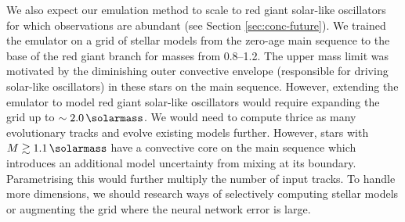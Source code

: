 


We also expect our emulation method to scale to red giant solar-like oscillators for which observations are abundant (see Section \ref{sec:conc-future}). We trained the emulator on a grid of stellar models from the zero-age main sequence to the base of the red giant branch for masses from \SIrange{0.8}{1.2}{\solarmass}. The upper mass limit was motivated by the diminishing outer convective envelope (responsible for driving solar-like oscillators) in these stars on the main sequence. However, extending the emulator to model red giant solar-like oscillators would require expanding the grid up to \(\sim\SI{2.0}{\solarmass}\). We would need to compute thrice as many evolutionary tracks and evolve existing models further. However, stars with \(M \gtrsim \SI{1.1}{\solarmass}\) have a convective core on the main sequence which introduces an additional model uncertainty from mixing at its boundary. Parametrising this would further multiply the number of input tracks. To handle more dimensions, we should research ways of selectively computing stellar models or augmenting the grid \citep[e.g.][]{Li.Davies.ea2022} where the neural network error is large.

